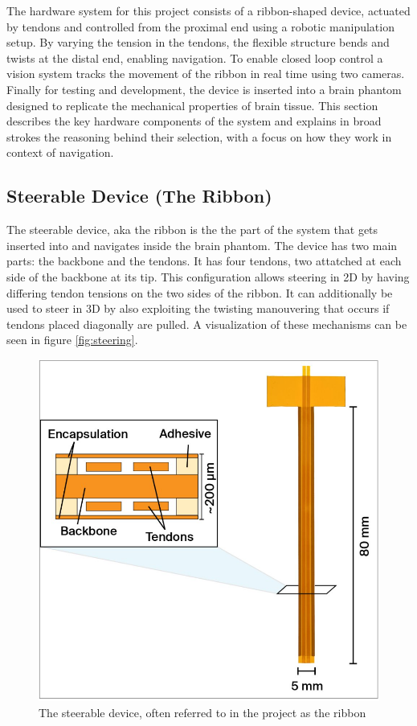 The hardware system for this project consists of a ribbon-shaped device, actuated by tendons and controlled from the proximal end using a robotic manipulation setup. By varying the tension in the tendons, the flexible structure bends and twists at the distal end, enabling navigation. To enable closed loop control a vision system tracks the movement of the ribbon in real time using two cameras. Finally for testing and development, the device is inserted into a brain phantom designed to replicate the mechanical properties of brain tissue. This section describes the key hardware components of the system and explains in broad strokes the reasoning behind their selection, with a focus on how they work in context of navigation.


\subsection{Steerable Device (The Ribbon)}
The steerable device, aka the ribbon is the the part of the system that gets inserted into and navigates inside the brain phantom. The device has two main parts: the backbone and the tendons. It has four tendons, two attatched at each side of the backbone at its tip. This configuration allows steering in 2D by having differing tendon tensions on the two sides of the ribbon. It can additionally be used to steer in 3D by also exploiting the twisting manouvering that occurs if tendons placed diagonally are pulled. A visualization of these mechanisms can be seen in figure \ref{fig:steering}.
\begin{figure} [H]
    \centering
    \includegraphics[width=0.55\linewidth]{images/Hardware/ribbon.PNG}
    \caption{The steerable device, often referred to in the project as the ribbon}
    \label{fig:ribbon}
\end{figure}
